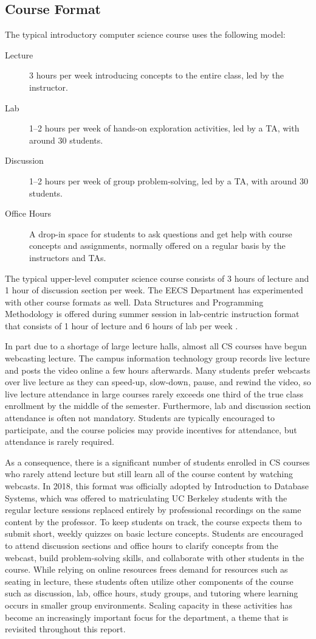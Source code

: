 \subsection{Course Format}

The typical introductory computer science course uses the following model:
\begin{description}
\item[Lecture] 3 hours per week introducing concepts to the entire class, led by the instructor.
\item[Lab] 1--2 hours per week of hands-on exploration activities, led by a TA, with around 30 students.
\item[Discussion] 1--2 hours per week of group problem-solving, led by a TA, with around 30 students.
\item[Office Hours] A drop-in space for students to ask questions and get help with course concepts and assignments, normally offered on a regular basis by the instructors and TAs. 
\end{description}
The typical upper-level computer science course consists of 3 hours of lecture and 1 hour of discussion section per week. The EECS Department has experimented with other course formats as well. Data Structures and Programming Methodology is offered during summer session in lab-centric instruction format that consists of 1 hour of lecture and 6 hours of lab per week \cite{Titterton:2010}.

In part due to a shortage of large lecture halls, almost all CS courses have begun webcasting lecture. The campus information technology group records live lecture and posts the video online a few hours afterwards. Many students prefer webcasts over live lecture as they can speed-up, slow-down, pause, and rewind the video, so live lecture attendance in large courses rarely exceeds one third of the true class enrollment by the middle of the semester. Furthermore, lab and discussion section attendance is often not mandatory. Students are typically encouraged to participate, and the course policies may provide incentives for attendance, but attendance is rarely required.

As a consequence, there is a significant number of students enrolled in CS courses who rarely attend lecture but still learn all of the course content by watching webcasts. In 2018, this format was officially adopted by Introduction to Database Systems, which was offered to matriculating UC Berkeley students with the regular lecture sessions replaced entirely by professional recordings on the same content by the professor. To keep students on track, the course expects them to submit short, weekly quizzes on basic lecture concepts. Students are encouraged to attend discussion sections and office hours to clarify concepts from the webcast, build problem-solving skills, and collaborate with other students in the course. While relying on online resources frees demand for resources such as seating in lecture, these students often utilize other components of the course such as discussion, lab, office hours, study groups, and tutoring where learning occurs in smaller group environments. Scaling capacity in these activities has become an increasingly important focus for the department, a theme that is revisited throughout this report.